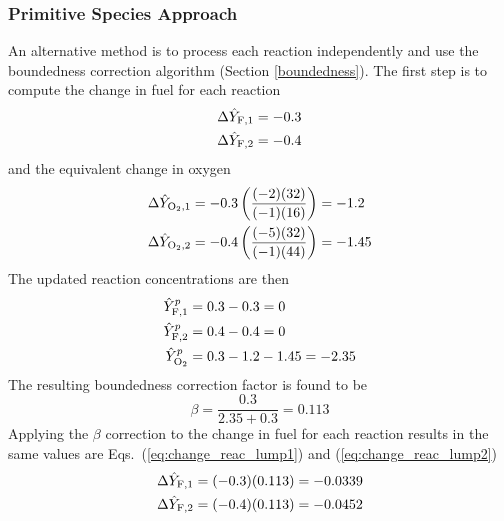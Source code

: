 \subsubsection{Primitive Species Approach}
An alternative method is to process each reaction independently and use the boundedness correction algorithm (Section \ref{boundedness}). The first step is to compute the change in fuel for each reaction
\begin{align}\label{eq:change_fuel_2reac}
\Delta \hat{Y}_{\rm F,1} &= -0.3\\
\Delta \hat{Y}_{\rm F,2} &= -0.4
\end{align}
and the equivalent change in oxygen
\begin{align}\label{eq:change_o2_2reac}
\Delta \hat{Y}_{\rm O_2,1} &= -0.3 \left( \frac{(-2)(32)}{(-1)(16)} \right) = -1.2 \\
\Delta \hat{Y}_{\rm O_2,2} &= -0.4 \left( \frac{(-5)(32)}{(-1)(44)} \right) = -1.45
\end{align}
The updated reaction concentrations are then
\begin{align}\label{eq:uncorrect_spec}
\hat{Y}_{{\rm F},1}^p &= 0.3 - 0.3 = 0 \\
\hat{Y}_{{\rm F},2}^p &= 0.4 - 0.4 = 0 \\
\hat{Y}_{\rm O_2}^p &= 0.3 - 1.2 - 1.45 = -2.35
\end{align}
The resulting boundedness correction factor is found to be
\begin{equation}\label{eq:calc_beta_two}
\beta = \frac{0.3}{2.35 + 0.3} = 0.113
\end{equation}
Applying the $\beta$ correction to the change in fuel for each reaction results in the same values are Eqs.~(\ref{eq:change_reac_lump1}) and (\ref{eq:change_reac_lump2})
\begin{align}
\Delta \hat{Y}_{\rm F,1} &= (-0.3)(0.113) = -0.0339 \label{eq:del_meth_C} \\
\Delta \hat{Y}_{\rm F,2} &= (-0.4)(0.113) = -0.0452 \label{eq:del_prop_c}
\end{align}


